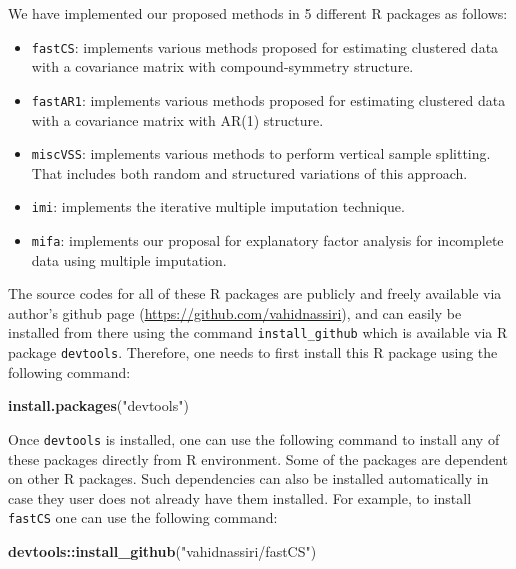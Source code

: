 \documentclass[11pt,a5paper,twoside]{book}
\newenvironment{Shaded}{\begin{snugshade}}{\end{snugshade}}
\newcommand{\KeywordTok}[1]{\textcolor[rgb]{0.13,0.29,0.53}{\textbf{#1}}}
\newcommand{\NormalTok}[1]{#1}
\newcommand{\StringTok}[1]{\textcolor[rgb]{0.31,0.60,0.02}{#1}}
\begin{document}
We have implemented our proposed methods in 5 different R packages as follows:

\begin{itemize}
\item {\tt{fastCS}}: implements various methods proposed for estimating clustered data with a covariance matrix with compound-symmetry structure.

\item {\tt{fastAR1}}: implements various methods proposed for estimating clustered data with a covariance matrix with AR(1) structure.

\item {\tt{miscVSS}}: implements various methods to perform vertical sample splitting. That includes both random and structured variations of this approach.

\item {\tt{imi}}: implements the iterative multiple imputation technique.

\item {\tt{mifa}}: implements our proposal for explanatory factor analysis for incomplete data using multiple imputation.

\end{itemize}

The source codes for all of these R packages are publicly and freely available via author's github page (\url{https://github.com/vahidnassiri}), and can easily be installed from there using the command {\tt{install\_github}} which is available via R package {\tt{devtools}}. Therefore, one needs to first install this R package using the following command:

\begin{Shaded}
\begin{Highlighting}[]
\KeywordTok{install.packages}\NormalTok{(}\StringTok{"devtools"}\NormalTok{)}
\end{Highlighting}
\end{Shaded}

Once {\tt{devtools}} is installed, one can use the following command to install any of these packages directly from R environment. Some of the packages are dependent on other R packages. Such dependencies can also be installed automatically in case they user does not already have them installed. For example, to install {\tt{fastCS}} one can use the following command:

\begin{Shaded}
\begin{Highlighting}[]
\KeywordTok{devtools::install_github}\NormalTok{(}\StringTok{"vahidnassiri/fastCS"}\NormalTok{)}
\end{Highlighting}
\end{Shaded}
\end{document}
